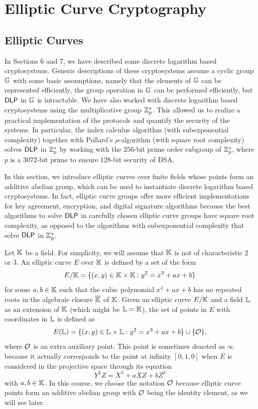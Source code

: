 \section{Elliptic Curve Cryptography}

\subsection{Elliptic Curves}
In Sections 6 and 7, we have described some discrete logarithm based cryptosystems.
Generic descriptions of these cryptosystems assume a cyclic group $\mathbb{G}$ with some 
basic assumptions, namely that the elements of $\mathbb{G}$ can be represented efficiently,
the group operation in $\mathbb{G}$ can be performed efficiently, but ${\sf DLP}$ in $\mathbb{G}$ is 
intractable. We have also worked with discrete logarithm based cryptosystems 
using the multiplicative group $\mathbb{Z}_p^*$. This allowed us to realize a 
practical implementation of the protocols and quantify the security of the 
systems. In particular, the index calculus algorithm (with subexponential
complexity) together with Pollard's $\rho$-algorithm (with square root 
complexity) solves ${\sf DLP}$ in $\mathbb{Z}_p^*$ by working with the $256$-bit prime 
order subgroup of $\mathbb{Z}_p^*$, where $p$ is a $3072$-bit prime to ensure 
$128$-bit security of DSA. 

In this section, we introduce elliptic curves over finite fields whose points 
form an additive abelian group, which can be used to instantiate discrete 
logarithm based cryptosystems. In fact, elliptic curve groups offer more 
efficient implementations for key agreement, encryption, and digital signature 
algorithms because the best algorithms to solve ${\sf DLP}$ in carefully chosen 
elliptic curve groups have square root complexity, as opposed to the algorithms 
with subexponential complexity that solve ${\sf DLP}$ in $\mathbb{Z}_p^*$. 

Let $\mathbb{K}$ be a field. For simplicity, we will assume that $\mathbb{K}$ is not of 
characteristic $2$ or $3$. An elliptic curve $E$ over $\mathbb{K}$ is defined by 
a set of the form 
\[ E/\mathbb{K} = \{(x, y) \in \mathbb{K} \times \mathbb{K} : y^2 = x^3 + ax + b\} \] 
for some $a, b \in \mathbb{K}$ such that the cubic polynomial $x^3 + ax + b$
has no repeated roots in the algebraic closure $\overline{\mathbb{K}}$ of $\mathbb{K}$.
Given an elliptic curve $E/\mathbb{K}$ and a field $\mathbb{L}$ as an extension of $\mathbb{K}$
(which might be $\mathbb{L} = \mathbb{K}$), the set of points in $E$ with coordinates 
in $\mathbb{L}$ is defined as 
\[ E(\mathbb{L}) = \{(x, y) \in \mathbb{L} \times \mathbb{L} : y^2 = x^3 + ax + b\} \cup \{\cal O\}, \] 
where ${\cal O}$ is an extra auxiliary point. This point is sometimes 
denoted as $\infty$ because it actually corresponds to the point at infinity 
$[0, 1, 0]$ when $E$ is considered in the projective space through its equation 
\[ Y^2 Z = X^3 + aXZ + bZ^3 \] 
with $a, b \in \mathbb{K}$. In this course, we choose the notation ${\cal O}$ because 
elliptic curve points form an additive abelian group with ${\cal O}$ 
being the identity element, as we will see later. 


